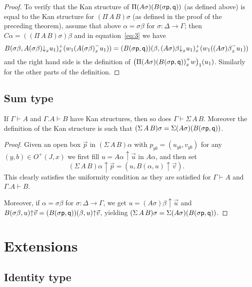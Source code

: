 \documentclass[10pt,a4paper]{article}
\newcommand{\pp}{{\sf p}}
\newcommand{\qq}{{\sf q}}
\newcommand{\rup}[1]{#1{\uparrow}}
\newcommand{\rdo}[1]{#1{\downarrow}}
\begin{document}
\begin{proof}
  To verify that the Kan structure of $\Pi (A \sigma) (B (\sigma \pp,
  \qq))$ (as defined above) is equal to the Kan structure for
  $(\Pi\,A\,B) \sigma$ (as defined in the proof of the preceding
  theorem), assume that above $\alpha = \sigma \beta$ for $\sigma
  \colon \Delta \to \Gamma$; then $C \alpha = ((\Pi\,A\,B) \sigma)
  \beta$ and in equation~\eqref{eq:3} we have
  \[
  B(\sigma \beta,\rdo{A(\sigma \beta)}_x u_1)^+_x (w_1 ({A(\sigma
    \beta)}^-_x u_1)) = (B (\sigma \pp, \qq)) (\beta, \rdo{(A\sigma)
    \beta}_x u_1)^+_x (w_1 ({(A \sigma) \beta}^-_x u_1))
  \]
  and the right hand side is the definition of $\bigl({\Pi(A \sigma)
    (B (\sigma \pp, \qq))}^+_x w\bigr)_1 (u_1)$.  Similarly for the
  other parts of the definition.
\end{proof}

\subsection{Sum type}

\begin{theorem}
  If $\Gamma \vdash A$ and $\Gamma.A \vdash B$ have Kan structures,
  then so does $\Gamma \vdash \Sigma\,A\,B$.  Moreover the definition
  of the Kan structure is such that $(\Sigma\,A\,B) \sigma = \Sigma (A
  \sigma) (B (\sigma \pp, \qq))$.
\end{theorem}
\begin{proof}
  Given an open box $\vec p$ in $(\Sigma\,A\,B) \alpha$ with
  $p_{yb}=(u_{yb},v_{yb})$ for any $(y,b)\in O^+(J,x)$ we first fill
  $u = \rup {A \alpha} {\vec u}$ in $A \alpha$, and then set
  \[
  \rup{(\Sigma\,A\,B) \alpha} {\vec p} = (u, \rup {B (\alpha, u)}
  {\vec v}).
  \]
  This clearly satisfies the uniformity condition as they are
  satisfied for $\Gamma \vdash A$ and $\Gamma.A \vdash B$.

  Moreover, if $\alpha = \sigma \beta$ for $\sigma \colon \Delta \to
  \Gamma$, we get $u = \rup {(A \sigma) \beta} {\vec u}$ and $\rup {B
    (\sigma \beta, u)} {\vec v} = \rup{(B (\sigma \pp, \qq)) (\beta,
    u)} {\vec v}$, yielding $(\Sigma\,A\,B) \sigma = \Sigma (A \sigma)
  (B (\sigma \pp, \qq))$.
\end{proof}


\section{Extensions}

\subsection{Identity type}
\label{sec:identity-type}
\end{document}
